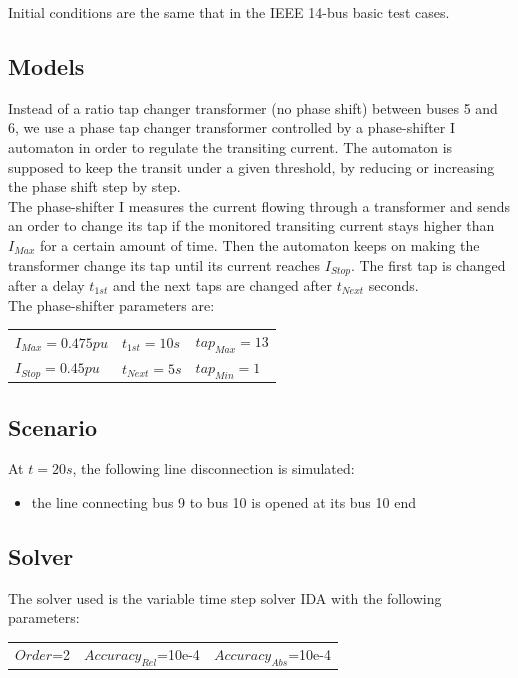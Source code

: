 \documentclass[a4paper, 12pt]{report}
\begin{document}
Initial conditions are the same that in the IEEE 14-bus basic test cases.

\subsection{Models}

Instead of a ratio tap changer transformer (no phase shift) between buses 5 and 6, we use a phase tap changer transformer controlled by a phase-shifter I automaton in order to regulate the transiting current.
The automaton is supposed to keep the transit under a given threshold, by reducing or increasing the phase shift step by step. \\

The phase-shifter I measures the current flowing through a transformer and sends an order to change its tap if the monitored transiting current stays higher than $I_{Max}$ for a certain amount of time. Then the automaton keeps on making the transformer change its tap until its current reaches $I_{Stop}$. The first tap is changed after a delay $t_{1st}$ and the next taps are changed after $t_{Next}$ seconds. \\

The phase-shifter parameters are:
\begin{center}
\begin{tabular}{l|l|l}
   $I_{Max}=0.475pu$ & $t_{1st}=10s$ & $tap_{Max}=13$ \\
   $I_{Stop}=0.45pu$  & $t_{Next}=5s$ & $tap_{Min}=1$ \\
\end{tabular}
\end{center}

\subsection{Scenario}
At $t=20s$, the following line disconnection is simulated:
\begin{itemize}
\item{the line connecting bus 9 to bus 10 is opened at its bus 10 end}
\end{itemize}

\subsection{Solver}
The solver used is the variable time step solver IDA with the following parameters:
\begin{center}
\begin{tabular}{l|l|l}
   $Order$=2 & $Accuracy_{Rel}$=10e-4 & $Accuracy_{Abs}$=10e-4 \\
\end{tabular}
\end{center}
\end{document}
